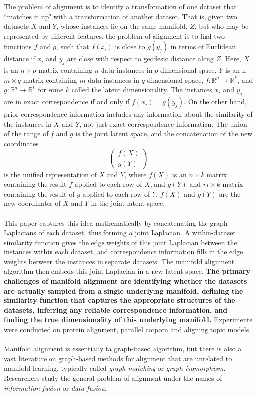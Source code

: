 \documentclass[]{article}
\begin{document}
		The problem of alignment is to identify a transformation of one dataset that ``matches it up" with a transformation of another dataset.  That is, given two datasets $X$ and $Y$, whose instances lie on the same manifold, $Z$, but who may be represented by different features, the problem of alignment is to find two functions $f$ and $g$, such that $f(x_i)$ is close to $g(y_j)$ in terms of Euclidean distance if $x_i$ and $y_j$ are close with respect to geodesic distance along $Z$.  Here, $X$ is an $n \times p$ matrix containing $n$ data instances in $p$-dimensional space, $Y$ is an n$m\times q$ matrix containing $m$ data instances in $q$-dimensional space, $f:\mathbb{R}^{p}\rightarrow\mathbb{R}^{k}$, and $g:\mathbb{R}^{q}\rightarrow\mathbb{R}^{k}$ for some $k$ called the latent dimensionality.  The instances $x_i$ and $y_j$ are in exact correspondence if and only if $f(x_i)=g(y_j)$.  On the other hand, prior correspondence information includes any information about the similarity of the instances in $X$ and $Y$, not just exact correspondence information. The union of the range of $f$ and $g$ is the joint latent space, and the concatenation of the new coordinates \[ \left( \begin{array}{cc}
		f(X) \\
		g(Y)  \end{array} \right)\] 
		is the unified representation of $X$ and $Y$, where $f(X)$ is an $n\times k$ matrix containing the result $f$ applied to each row of $X$, and $g(Y)$ and $m \times k$ matrix containing the result of $g$ applied to each row of $Y$.  $f(X)$ and $g(Y)$ are the new coordinates of $X$ and $Y$ in the joint latent space.
		\\ \\	
		This paper captures this idea mathematically by concatenating the graph Laplacians of each dataset, thus forming a joint Laplacian.  A within-dataset similarity function gives the edge weights of this joint Laplacian between the instances within each dataset, and correspondence information fills in the edge weights between the instances in separate datasets.  The manifold alignment algorithm then embeds this joint Laplacian in a new latent space.  \textbf{The primary challenges of manifold alignment are identifying whether the datasets are actually sampled from a single underlying manifold, defining the similarity function that captures the appropriate structures of the datasets, inferring any reliable correspondence information, and finding the true dimensionality of this underlying manifold.} Experiments were conducted on protein alignment, parallel corpora and aligning topic models. \\ \\Manifold alignment is essentially ta graph-based algorithm, but there is also a vast literature on graph-based methods for alignment that are unrelated to manifold learning, typically called \textit{graph matching} or \textit{graph isomorphism}. Researchers study the general problem of alignment under the names of \textit{information fusion} or \textit{data fusion}. \\
		
\end{document}
